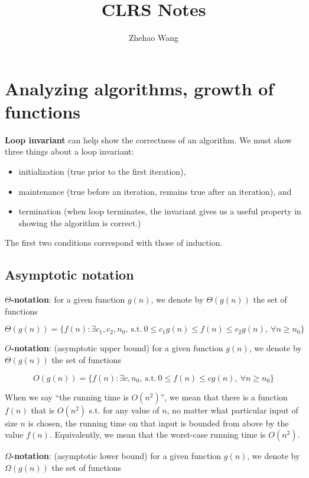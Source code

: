 \documentclass{article}
\begin{document}
\title{CLRS Notes}
\author{Zhehao Wang}

\maketitle{}

\section{Analyzing algorithms, growth of functions}

\textbf{Loop invariant} can help show the correctness of an algorithm.
We must show three things about a loop invariant:
\begin{itemize}
  \item initialization (true prior to the first iteration),
  \item maintenance (true before an iteration, remains true after an iteration), and
  \item termination (when loop terminates, the invariant gives us a useful property in showing the algorithm is correct.)
\end{itemize}

The first two conditions correspond with those of induction.

\subsection{Asymptotic notation}

\textbf{$\Theta$-notation}: for a given function $g(n)$, we denote by $\Theta(g(n))$ the set of functions

$$
\Theta(g(n)) = \{ f(n): \exists c_1, c_2, n_0, ~ \text{s.t.} ~ 0 \leq c_1 g(n) \leq f(n) \leq c_2 g(n), ~ \forall n \geq n_0 \}
$$

\textbf{$O$-notation}: (asymptotic upper bound) for a given function $g(n)$, we denote by $\Theta(g(n))$ the set of functions

$$
O(g(n)) = \{ f(n): \exists c, n_0, ~ \text{s.t.} ~ 0 \leq f(n) \leq c g(n), ~ \forall n \geq n_0 \}
$$

When we say ``the running time is $O(n^2)$'', we mean that there is a function $f(n)$ that is $O(n^2)$ s.t. for any value of $n$, no matter what particular input of size $n$ is chosen, the running time on that input is bounded from above by the value $f(n)$.
Equivalently, we mean that the worst-case running time is $O(n^2)$.

\textbf{$\Omega$-notation}: (asymptotic lower bound) for a given function $g(n)$, we denote by $\Omega(g(n))$ the set of functions
\end{document}
